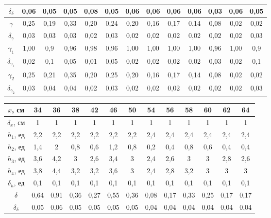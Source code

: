 \documentclass[a4paper, 12pt]{article}%
\begin{document}
\begin{enumerate}
\begin{table}[h!]
\begin{center}
\begin{tabular}{|c|c|c|c|c|c|c|c|c|c|c|c|c|}
$\delta_{\delta}$   & 0,06 & 0,05 & 0,05 & 0,08 & 0,05 & 0,06 & 0,06 & 0,06 & 0,06 & 0,03 & 0,06 & 0,05 \\ \hline
$\gamma$            & 0,25 & 0,19 & 0,33 & 0,20 & 0,24 & 0,20 & 0,16 & 0,17 & 0,14 & 0,08 & 0,02 & 0,02 \\ \hline
$\delta_{\gamma}$   & 0,03 & 0,03 & 0,03 & 0,02 & 0,03 & 0,02 & 0,02 & 0,02 & 0,02 & 0,02 & 0,02 & 0,03 \\ \hline
$\gamma_1$          & 1,00 & 0,9  & 0,96 & 0,98 & 0,96 & 1,00 & 1,00 & 1,00 & 1,00 & 0,96 & 1,00 & 0,9  \\ \hline
$\delta_{\gamma_1}$ & 0,02 & 0,1  & 0,05 & 0,01 & 0,05 & 0,02 & 0,02 & 0,02 & 0,02 & 0,03 & 0,02 & 0,1  \\ \hline
$\gamma_2$          & 0,25 & 0,21 & 0,35 & 0,20 & 0,25 & 0,20 & 0,16 & 0,17 & 0,14 & 0,08 & 0,02 & 0,02 \\ \hline
$\delta_{\gamma_2}$ & 0,03 & 0,04 & 0,04 & 0,02 & 0,03 & 0,02 & 0,02 & 0,02 & 0,02 & 0,02 & 0,02 & 0,03 \\ \hline
\end{tabular}
\begin{tabular}{|c|c|c|c|c|c|c|c|c|c|c|c|c|}
\hline
$x$, см             & 34   & 36   & 38   & 42   & 46   & 50   & 54   & 56   & 58   & 60   & 62   & 64   \\ \hline
$\delta_x$, см      & 1    & 1    & 1    & 1    & 1    & 1    & 1    & 1    & 1    & 1    & 1    & 1    \\ \hline
$h_1$, ед           & 2,2  & 2,2  & 2,2  & 2,2  & 2,2  & 2,2  & 2,4  & 2,4  & 2,4  & 2,4  & 2,4  & 2,4  \\ \hline
$h_2$, ед           & 1,4  & 2    & 0,8  & 0,6  & 1,2  & 0,8  & 0,2  & 0,4  & 0,8  & 0,6  & 0,4  & 0,4  \\ \hline
$h_3$, ед           & 3,6  & 4,2  & 3    & 2,6  & 3,4  & 3    & 2,4  & 2,6  & 3    & 3    & 2,8  & 2,6  \\ \hline
$h_4$, ед           & 3,8  & 4,4  & 3,2  & 3,2  & 3,6  & 3    & 2,4  & 2,8  & 3,2  & 3    & 3    & 3    \\ \hline
$\delta_h$, ед      & 0,1  & 0,1  & 0,1  & 0,1  & 0,1  & 0,1  & 0,1  & 0,1  & 0,1  & 0,1  & 0,1  & 0,1  \\ \hline
$\delta$            & 0,64 & 0,91 & 0,36 & 0,27 & 0,55 & 0,36 & 0,08 & 0,17 & 0,33 & 0,25 & 0,17 & 0,17 \\ \hline
$\delta_{\delta}$   & 0,05 & 0,06 & 0,05 & 0,05 & 0,05 & 0,05 & 0,04 & 0,04 & 0,04 & 0,04 & 0,04 & 0,04 \\ \hline

\end{tabular}
\end{center}
\end{table}
\end{enumerate}
\end{document}
